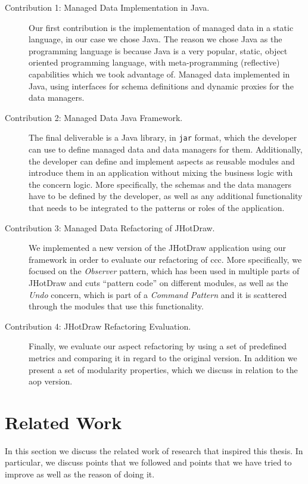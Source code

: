 \begin{description}
  \item[Contribution 1: Managed Data Implementation in Java.]
  Our first contribution is the implementation of managed data in a static language, in our case we chose Java.
  The reason we chose Java as the programming language is because Java is a very popular, static, object oriented programming language, with meta-programming (reflective) capabilities which we took advantage of.
  Managed data implemented in Java, using interfaces for schema definitions and dynamic proxies for the data managers.

  \item[Contribution 2: Managed Data Java Framework.]
  The final deliverable is a Java library, in \texttt{jar} format, which the developer can use to define managed data and data managers for them. 
  Additionally, the developer can define and implement aspects as reusable modules and introduce them in an application without mixing the business logic with the concern logic. 
  More specifically, the schemas and the data managers have to be defined by the developer, as well as any additional functionality that needs to be integrated to the patterns or roles of the application.

  \item[Contribution 3: Managed Data Refactoring of JHotDraw.]
  We implemented a new version of the JHotDraw application using our framework in order to evaluate our refactoring of \ac{ccc}.
  More specifically, we focused on the \textit{Observer} pattern, which has been used in multiple parts of JHotDraw and cuts ``pattern code'' on different modules, as well as the \textit{Undo} concern, which is part of a \textit{Command Pattern} and it is scattered through the modules that use this functionality.

  \item[Contribution 4: JHotDraw Refactoring Evaluation.]
  Finally, we evaluate our aspect refactoring by using a set of predefined metrics and comparing it in regard to the original version.
  In addition we present a set of modularity properties, which we discuss in relation to the \ac{aop} version.
\end{description}

\section{Related Work}\label{Related Work}
In this section we discuss the related work of research that inspired this thesis.
In particular, we discuss points that we followed and points that we have tried to improve as well as the reason of doing it.

